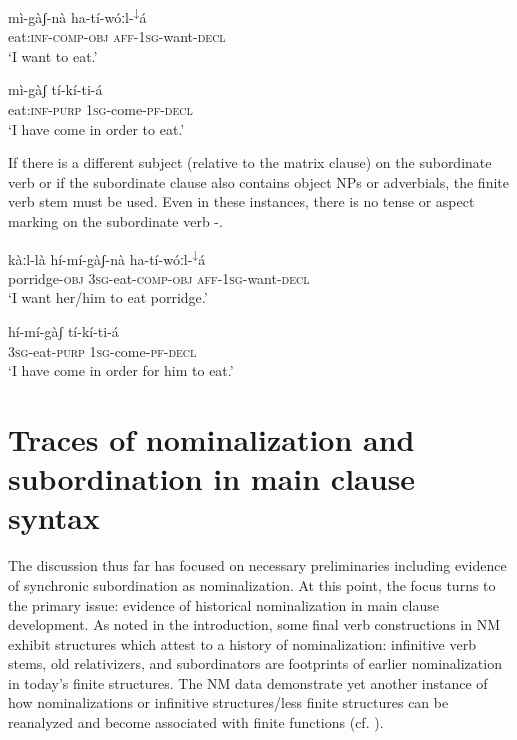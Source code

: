 \documentclass[output=paper]{langsci/langscibook}
\begin{document}
\ea\label{ex:mahland:48}
\gll m\`{i}-g\`{a}ʃ-n\`{a}              ha-t\'{i}-w\'{o}ːl-\textsuperscript{↓}\'{a}  \\
eat:\textsc{inf-comp-obj   aff-1sg}{}-want-\textsc{decl}   \\
\glt `I want to eat.'
\z

\ea\label{ex:mahland:49}
\gll m\`{i}-g\`{a}ʃ            t\'{i}-k\'{i}-ti-\'{a}\\
eat:\textsc{inf-purp   1sg}{}-come\textsc{{}-pf-decl} \\
\glt `I have come in order to eat.'
\z

If there is a different subject (relative to the matrix clause) on the subordinate verb or if the subordinate clause also contains object NPs or adverbials, the finite verb stem must be used. Even in these instances, there is no tense or aspect marking on the subordinate verb -.

\ea\label{ex:mahland:50}
\gll k\`{a}ːl-l\`{a}            h\'{i}-m\'{i}-g\`{a}ʃ-n\`{a}           ha-t\'{i}-w\'{o}ːl-\textsuperscript{↓}\'{a}  \\
porridge-\textsc{obj   3sg-}eat-\textsc{comp-obj   aff-1sg-}want-\textsc{decl}  \\
\glt `I want her/him to eat porridge.'
\z

\ea\label{ex:mahland:51}
\gll h\'{i}-m\'{i}-g\`{a}ʃ          t\'{i}-k\'{i}-ti-\'{a}\\
\textsc{3sg}{}-eat-\textsc{purp   1sg}{}-come-\textsc{pf-decl} \\
\glt `I have come in order for him to eat.'
\z

\section{Traces of nominalization and subordination in main clause syntax}\label{sec:mahland:3}

The discussion thus far has focused on necessary preliminaries including evidence of synchronic subordination as nominalization. At this point, the focus turns to the primary issue: evidence of historical nominalization in main clause development. As noted in the introduction, some final verb constructions in NM exhibit structures which attest to a history of nominalization: infinitive verb stems, old relativizers, and subordinators are footprints of earlier nominalization in today's finite structures. The NM data demonstrate yet another instance of how nominalizations or infinitive structures/less finite structures can be reanalyzed and become associated with finite functions (cf. \citealt{Givon2009, DeLancey2011}).
\end{document}
